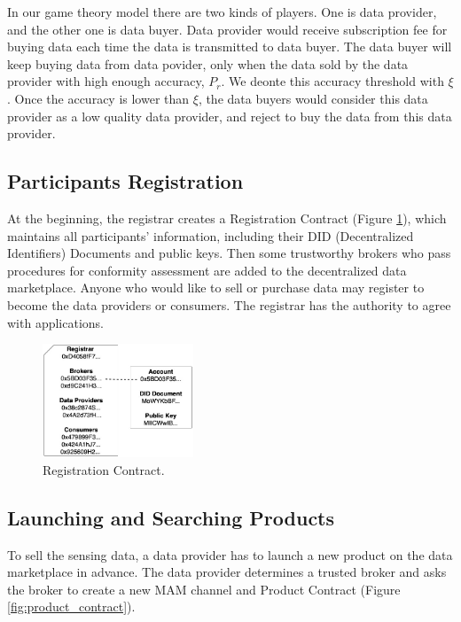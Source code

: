 \documentclass[journal,a4paper]{IEEEtran}
\begin{document}
In our game theory model there are two kinds of players. One is data provider, and the other one is data buyer. Data provider would receive subscription fee for buying data each time the data is transmitted to data buyer.
The data buyer will keep buying data from data povider, only when the data sold by the data provider with high enough accuracy, $P_r$. We deonte this accuracy threshold with $\xi$.
Once the accuracy is lower than $\xi$, the data buyers would consider this data provider as a low quality data provider, and reject to buy the data from this data provider.



\subsection{Participants Registration}
At the beginning, the registrar creates a Registration Contract (Figure \ref{fig:registration_contract}), which maintains all participants' information, including their DID (Decentralized Identifiers) Documents and public keys. Then some trustworthy brokers who pass procedures for conformity assessment are added to the decentralized data marketplace. Anyone who would like to sell or purchase data may register to become the data providers or consumers. The registrar has the authority to agree with applications.

\begin{figure}[h]
	\centering
	\includegraphics[width=0.4\textwidth]{registration_contract}
	\caption{Registration Contract.}
	\label{fig:registration_contract}
\end{figure}

\subsection{Launching and Searching Products}
To sell the sensing data, a data provider has to launch a new product on the data marketplace in advance. The data provider determines a trusted broker and asks the broker to create a new MAM channel and Product Contract (Figure \ref{fig:product_contract}).
\end{document}
